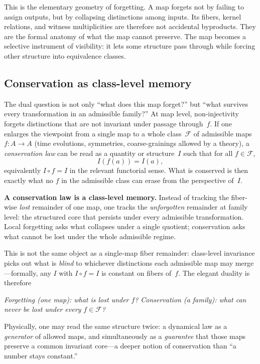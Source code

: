 \documentclass[11pt,a4paper]{article}
\newenvironment{keybox}[1]{%
  \Needspace*{8\baselineskip}%
  \begin{tcolorbox}[
    enhanced,
    breakable=false,
    colback=blue!5,
    colframe=blue!45!black,
    coltitle=black,
    colbacktitle=blue!14,
    boxrule=0.85pt,
    arc=2.5pt,
    left=9pt, right=9pt, top=6pt, bottom=6pt,
    titlerule=0.55pt,
    fonttitle=\bfseries,
    title={#1},
    before upper=\raggedright,
    before skip=0.9\baselineskip,
    after skip=0.9\baselineskip
  ]%
}{%
  \end{tcolorbox}%
}
\theoremstyle{plain}
\theoremstyle{definition}
\theoremstyle{remark}
\begin{document}
This is the elementary geometry of forgetting. A map forgets not by failing to assign outputs, but by collapsing distinctions among inputs. Its fibers, kernel relations, and witness multiplicities are therefore not accidental byproducts. They are the formal anatomy of what the map cannot preserve. The map becomes a selective instrument of visibility: it lets some structure pass through while forcing other structure into equivalence classes.

\subsection{Conservation as class-level memory}
\label{sec:representation-conservation}

The dual question is not only ``what does this map forget?'' but ``what survives every transformation in an admissible family?''  At map level, non-injectivity forgets distinctions that are not invariant under passage through~$f$.  If one enlarges the viewpoint from a single map to a whole class~$\mathcal{F}$ of admissible maps $f \colon A \to A$ (time evolutions, symmetries, coarse-grainings allowed by a theory), a \emph{conservation law} can be read as a quantity or structure~$I$ such that for all $f \in \mathcal{F}$,
\[
  I(f(a)) = I(a),
\]
equivalently $I \circ f = I$ in the relevant functorial sense.  What is conserved is then exactly what no $f$ in the admissible class can erase from the perspective of~$I$.

\begin{keybox}{Conservation is class-level memory}
\textbf{A conservation law is a class-level memory.}  Instead of tracking the fiber-wise \emph{lost} remainder of one map, one tracks the \emph{unforgotten} remainder at family level: the structured core that persists under every admissible transformation.  Local forgetting asks what collapses under a single quotient; conservation asks what cannot be lost under the whole admissible regime.
\end{keybox}

This is not the same object as a single-map fiber remainder: class-level invariance picks out what is \emph{blind} to whichever distinctions each admissible map may merge---formally, any $I$ with $I \circ f = I$ is constant on fibers of~$f$.  The elegant duality is therefore
\begin{center}
\textit{Forgetting (one map): what is lost under $f$?}
\qquad
\textit{Conservation (a family): what can never be lost under every $f \in \mathcal{F}$?}
\end{center}
Physically, one may read the same structure twice: a dynamical law as a \emph{generator} of allowed maps, and simultaneously as a \emph{guarantee} that those maps preserve a common invariant core---a deeper notion of conservation than ``a number stays constant.''
\end{document}

